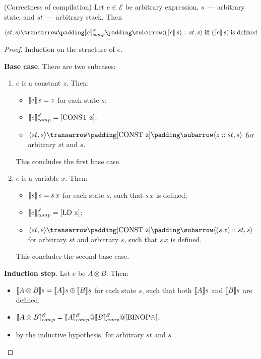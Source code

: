 \begin{theorem}(Correctness of compilation)
  Let $e\in\mathscr E$ be arbitrary expression, $s$~--- arbitrary state, and $st$~--- arbitrary stack. Then

  \[
    \trans{\inbr{st, s}}{\sembr{e}^{\mathscr E}_{comp}}{\inbr{(\sembr{e}\,s)::st, s}}\; \mbox{iff} \; (\sembr{e}\,s)\; \mbox{is defined}
  \]
\end{theorem}
\begin{proof}
  Induction on the structure of $e$.

  \textbf{Base case}. There are two subcases:

  \begin{enumerate}
  \item $e$ is a constant $z$. Then:
     \begin{itemize}
       \item $\llbracket{e}\rrbracket\,s=z$ for each state $s$;
       \item \mbox{$\sembr{e}^{\mathscr E}_{comp}=[\llang{CONST z}]$};
       \item $\trans{\inbr{st, s}}{[\llang{CONST z}]}{\inbr{z::st, s}}$ for arbitrary $st$ and $s$.
     \end{itemize}

     This concludes the first base case.

   \item $e$ is a variable $x$. Then:
     \begin{itemize}
       \item $\llbracket{s}\rrbracket\,s=s\,x$ for each state $s$, such that $s\,x$ is defined;
       \item \mbox{$\sembr{e}^{\mathscr E}_{comp}=[\llang{LD x}]$};
       \item $\trans{\inbr{st, s}}{[\llang{CONST z}]}{\inbr{(s\,x)::st, s}}$ for arbitrary $st$ and arbitrary $s$, such that $s\, x$ is defined.
     \end{itemize}

     This concludes the second base case.     
  \end{enumerate}

  \textbf{Induction step}. Let $e$ be $A\otimes B$. Then:

  \begin{itemize}
    \item $\llbracket{A\otimes B}\rrbracket s=\llbracket{A}\rrbracket s\oplus\llbracket{B}\rrbracket s$ for each state $s$, such that both $\llbracket{A}\rrbracket s$ and $\llbracket{B}\rrbracket s$ are defined;
    \item $\sembr{A\otimes B}^{\mathscr E}_{comp}=\sembr{A}^{\mathscr E}_{comp}\llang{@}\sembr{B}^{\mathscr E}_{comp}\llang{@[BINOP $\oplus$]}$;
    \item by the inductive hypothesis, for arbitrary $st$ and $s$


\end{itemize}
\end{proof}
